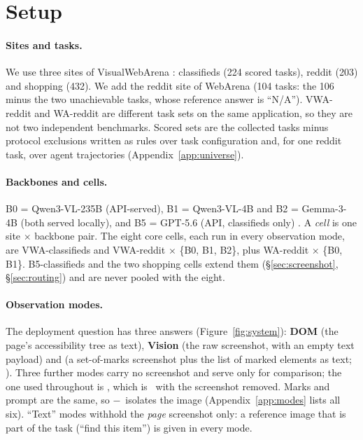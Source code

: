 \section{Setup}\label{sec:setup}

\paragraph{Sites and tasks.} We use three sites of VisualWebArena \citep{koh2024visualwebarena}: classifieds (224 scored tasks), reddit (203) and shopping (432). We add the reddit site of WebArena \citep{zhou2024webarena} (104 tasks: the 106 minus the two unachievable tasks, whose reference answer is ``N/A''). VWA-reddit and WA-reddit are different task sets on the same application, so they are not two independent benchmarks. Scored sets are the collected tasks minus protocol exclusions written as rules over task configuration and, for one reddit task, over agent trajectories (Appendix~\ref{app:universe}).

\paragraph{Backbones and cells.} B0 = Qwen3-VL-235B (API-served), B1 = Qwen3-VL-4B and B2 = Gemma-3-4B (both served locally), and B5 = GPT-5.6 (API, classifieds only) \citep{bai2025qwen3vl,gemma2025gemma3,openai2026gpt56}. A \emph{cell} is one site $\times$ backbone pair. The eight core cells, each run in every observation mode, are VWA-classifieds and VWA-reddit $\times$ \{B0, B1, B2\}, plus WA-reddit $\times$ \{B0, B1\}. B5-classifieds and the two shopping cells extend them (\S\ref{sec:screenshot}, \S\ref{sec:routing}) and are never pooled with the eight.

\paragraph{Observation modes.} The deployment question has three answers (Figure~\ref{fig:system}): \textbf{DOM} (the page's accessibility tree as text), \textbf{Vision} (the raw screenshot, with an empty text payload) and \textbf{\SoM} (a set-of-marks screenshot plus the list of marked elements as text; \citealp{yang2023som}). Three further modes carry no screenshot and serve only for comparison; the one used throughout is \textbf{\PSoM}, which is \SoM\ with the screenshot removed. Marks and prompt are the same, so \SoM$-$\PSoM\ isolates the image (Appendix~\ref{app:modes} lists all six). ``Text'' modes withhold the \emph{page} screenshot only: a reference image that is part of the task (``find this item'') is given in every mode.

